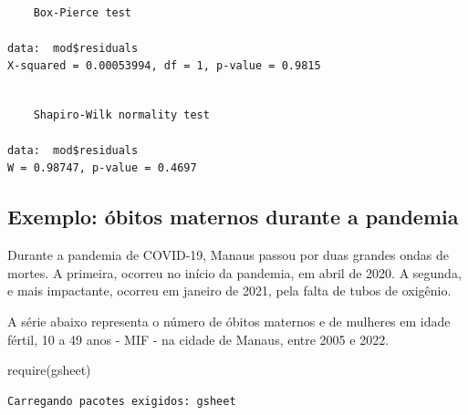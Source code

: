 \documentclass[
  letterpaper,
  DIV=11,
  numbers=noendperiod]{scrartcl}
\newenvironment{Shaded}{\begin{snugshade}}{\end{snugshade}}
\newcommand{\AttributeTok}[1]{\textcolor[rgb]{0.40,0.45,0.13}{#1}}
\newcommand{\DecValTok}[1]{\textcolor[rgb]{0.68,0.00,0.00}{#1}}
\newcommand{\FunctionTok}[1]{\textcolor[rgb]{0.28,0.35,0.67}{#1}}
\newcommand{\NormalTok}[1]{\textcolor[rgb]{0.00,0.23,0.31}{#1}}
\newcommand{\OtherTok}[1]{\textcolor[rgb]{0.00,0.23,0.31}{#1}}
\newcommand{\SpecialCharTok}[1]{\textcolor[rgb]{0.37,0.37,0.37}{#1}}
\newcommand{\StringTok}[1]{\textcolor[rgb]{0.13,0.47,0.30}{#1}}
\theoremstyle{definition}
\theoremstyle{definition}
\theoremstyle{plain}
\theoremstyle{plain}
\theoremstyle{remark}
\begin{document}
\begin{verbatim}

    Box-Pierce test

data:  mod$residuals
X-squared = 0.00053994, df = 1, p-value = 0.9815
\end{verbatim}

\begin{Shaded}
\end{Shaded}

\begin{verbatim}

    Shapiro-Wilk normality test

data:  mod$residuals
W = 0.98747, p-value = 0.4697
\end{verbatim}

\subsection{Exemplo: óbitos maternos durante a
pandemia}\label{exemplo-uxf3bitos-maternos-durante-a-pandemia}

Durante a pandemia de COVID-19, Manaus passou por duas grandes ondas de
mortes. A primeira, ocorreu no início da pandemia, em abril de 2020. A
segunda, e mais impactante, ocorreu em janeiro de 2021, pela falta de
tubos de oxigênio.

A série abaixo representa o número de óbitos maternos e de mulheres em
idade fértil, 10 a 49 anos - MIF - na cidade de Manaus, entre 2005 e
2022.

\begin{Shaded}
\begin{Highlighting}[]
\FunctionTok{require}\NormalTok{(gsheet)}
\end{Highlighting}
\end{Shaded}

\begin{verbatim}
Carregando pacotes exigidos: gsheet
\end{verbatim}

\begin{Shaded}
\end{Shaded}
\end{document}
